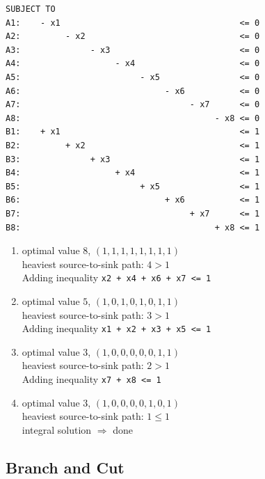 \documentclass[a4paper, oneside]{scrartcl}
\begin{document}
\begin{enumerate}
\begin{verbatim}
SUBJECT TO
A1:    - x1                                    <= 0
A2:         - x2                               <= 0
A3:              - x3                          <= 0
A4:                   - x4                     <= 0
A5:                        - x5                <= 0
A6:                             - x6           <= 0
A7:                                  - x7      <= 0
A8:                                       - x8 <= 0
B1:    + x1                                    <= 1
B2:         + x2                               <= 1
B3:              + x3                          <= 1
B4:                   + x4                     <= 1
B5:                        + x5                <= 1
B6:                             + x6           <= 1
B7:                                  + x7      <= 1
B8:                                       + x8 <= 1  
  \end{verbatim}
  \begin{enumerate}
    \item optimal value $8$, $(1,1,1,1,1,1,1,1)$ \\ 
          heaviest source-to-sink path: $4 > 1$ \\
          Adding inequality \texttt{x2 + x4 + x6 + x7 <= 1}
    \item optimal value $5$, $(1,0,1,0,1,0,1,1)$ \\ 
          heaviest source-to-sink path: $3 > 1$ \\
          Adding inequality \texttt{x1 + x2 + x3 + x5 <= 1}
    \item optimal value $3$, $(1,0,0,0,0,0,1,1)$ \\ 
          heaviest source-to-sink path: $2 > 1$ \\
          Adding inequality \texttt{x7 + x8 <= 1}
    \item optimal value $3$, $(1,0,0,0,0,1,0,1)$ \\ 
          heaviest source-to-sink path: $1 \leq 1$ \\
          integral solution $\Rightarrow$ done
  \end{enumerate}
\end{enumerate}

\subsection{Branch and Cut}
\end{document}
